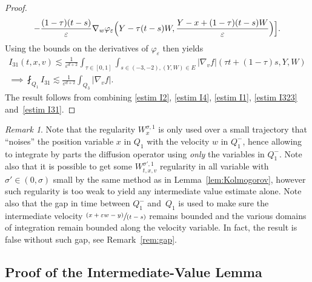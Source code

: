 \documentclass[10pt]{amsart}
\newcommand{\pspfrac}[2]{\sfrac{(#1)}{(#2)}}
\theoremstyle{definition}
\theoremstyle{remark}
\newtheorem{remark}[theorem]{Remark}
\let\var\varepsilon
\begin{document}
\begin{proof}
\begin{multline*}
-\frac{(1-\tau)(t-s)}{\var}\nabla_w\varphi_\var
\Bigl(Y-\tau (t-s)W,\frac{Y-x+(1-\tau)(t-s)W}{\varepsilon}
\Bigr)\Bigr].
\end{multline*}
Using the bounds on the derivatives of $\varphi_\var$ then
yields
\begin{multline}
I_{31}(t,x,v) \lesssim \frac{1}{ \varepsilon^{d+2}}
\int_{\tau \in [0,1]}\int_{s\in
(-3,-2), (Y,W)\in E} |\nabla_v f|\left(\tau
t+(1-\tau)s,Y,W\right) \\
\implies
\label{estim I31}
\fint_{Q_1} I_{31} \lesssim
\frac{1}{ \varepsilon^{d+2}} \int_{Q_3} |\nabla_v f|.
\end{multline}
The result follows from combining \eqref{estim I2},
\eqref{estim I4}, \eqref{estim I1}, \eqref{estim I323}
and~\eqref{estim I31}.
\end{proof}

\begin{remark}
Note that the regularity $W^{\sigma,1}_{x}$ is only used over a
small trajectory that ``noises'' the position variable $x$ in
$Q_1$ with the velocity $w$ in $Q_1^-$, hence allowing to
integrate by parts the diffusion operator using \emph{only} the
variables in $Q_1^-$. Note also that it is possible to get some
$W^{\sigma',1}_{t,x,v}$ regularity in all variable with
$\sigma' \in (0,\sigma)$ small by the same method as in
Lemma~\ref{lem:Kolmogorov}, however such regularity is too weak
to yield any intermediate value estimate alone. Note also that
the gap in time between $Q_1^-$ and~$Q_1$ is used to make sure
the intermediate velocity $\pspfrac{x+\var w-y}{t-s}$ remains
bounded and the various domains of integration remain bounded
along the velocity variable. In fact, the result is false
without such gap, see Remark~\ref{rem:gap}.
\end{remark}

\subsection{Proof of the Intermediate-Value Lemma}
\label{ss:proof-ivl}
\end{document}
